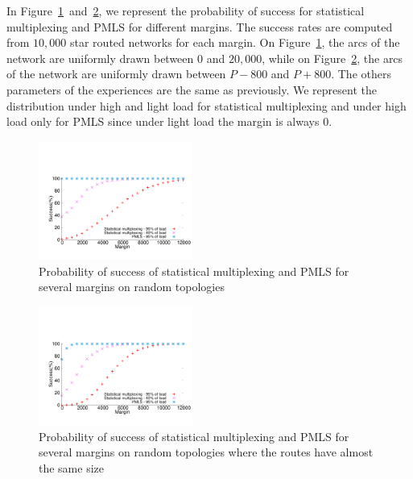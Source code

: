 \documentclass[10pt, conference, letterpaper]{IEEEtran}
\begin{document}
     In Figure~\ref{fig:sto}~and~\ref{fig:stobad}, we represent the probability of success for 
     statistical multiplexing and PMLS for different margins. The success rates are computed from $10,000$ star routed networks for each margin. On Figure~\ref{fig:sto}, the arcs of the network are uniformly drawn between $0$ and $20,000$, while on Figure~\ref{fig:stobad}, the arcs of the network are uniformly drawn between $P-800$ and $P+800$. The others parameters of the experiences are the same as previously. We represent the distribution under high and light load for statistical multiplexing and under high load only for PMLS since under light load the margin is always $0$. 
     

    \begin{figure}
       \begin{center}
      \includegraphics[width = 0.45\textwidth]{stochastic.pdf}
      \end{center}
      \caption{Probability of success of statistical multiplexing and PMLS for several margins on random topologies}
      \label{fig:sto}   
     \end{figure}    
     
         \begin{figure}
       \begin{center}
      \includegraphics[width = 0.45\textwidth]{stochasticbad.pdf}
      \end{center}
      \caption{Probability of success of statistical multiplexing and PMLS for several margins on random topologies where the routes have almost the same size}
      \label{fig:stobad}   
     \end{figure}    
     
\end{document}

